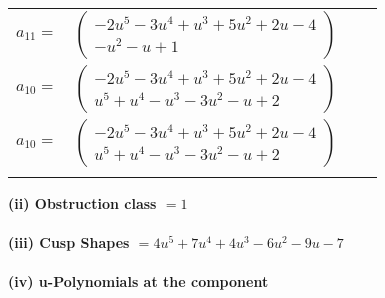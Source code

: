 \documentclass[1p]{elsarticle_modified}
\theoremstyle{definition}
\begin{document}
\begin{tabular}{m{7pt} m{180pt} m{7pt} m{180pt} }
\flushright $a_{11}=$&$\begin{pmatrix}-2 u^5-3 u^4+u^3+5 u^2+2 u-4\\- u^2- u+1\end{pmatrix}$ \\
\flushright $a_{10}=$&$\begin{pmatrix}-2 u^5-3 u^4+u^3+5 u^2+2 u-4\\u^5+u^4- u^3-3 u^2- u+2\end{pmatrix}$\\ \flushright $a_{10}=$&$\begin{pmatrix}-2 u^5-3 u^4+u^3+5 u^2+2 u-4\\u^5+u^4- u^3-3 u^2- u+2\end{pmatrix}$\\&\end{tabular}
\flushleft \textbf{(ii) Obstruction class $= 1$}\\~\\
\flushleft \textbf{(iii) Cusp Shapes $= 4 u^5+7 u^4+4 u^3-6 u^2-9 u-7$}\\~\\
\newpage\renewcommand{\arraystretch}{1}
\flushleft \textbf{(iv) u-Polynomials at the component}\newline \\
\end{document}
